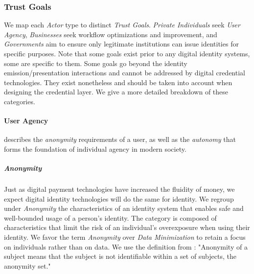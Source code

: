 \subsubsection{Trust Goals}
\label{subsub:trust_goals}

\vspace{1em}


We map each \emph{Actor} type to distinct \emph{Trust Goals}. \emph{Private Individuals} seek \emph{User Agency}, \emph{Businesses} seek workflow optimizations and improvement, and \emph{Governments} aim to ensure only legitimate institutions can issue identities for specific purposes.
Note that some goals exist prior to any digital identity systems, some are specific to them. Some goals go beyond the identity emission/presentation interactions and cannot be addressed by digital credential technologies. 
They exist nonetheless and should be taken into account when designing the credential layer. We give a more detailed breakdown of these categories.


\paragraph{User Agency} describes the \emph{anonymity} requirements of a user, as well as the \emph{autonomy} that forms the foundation of individual agency in modern society.

\subparagraph{Anonymity} Just as digital payment technologies have increased the fluidity of money, we expect digital identity technologies will do the same for identity. We regroup under \emph{Anonymity} the characteristics of an identity system that enables safe and well-bounded usage of a person's identity. The category is composed of characteristics that limit the risk of an individual's overexposure when using their identity. We favor the term \emph{Anonymity} over \emph{Data Minimization} to retain a focus on individuals rather than on data. We use the definition from \cite{ph10}: "Anonymity of a subject means that the subject is not identifiable within a set of
subjects, the anonymity set."

